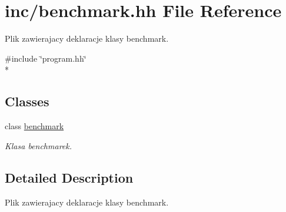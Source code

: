 \hypertarget{benchmark_8hh}{\section{inc/benchmark.hh File Reference}
\label{benchmark_8hh}
}


Plik zawierajacy deklaracje klasy benchmark.  


{\ttfamily \#include \char`\"{}program.\+hh\char`\"{}}\\*
\subsection*{Classes}
\begin{DoxyCompactItemize}
\item 
class \hyperlink{classbenchmark}{benchmark}
\begin{DoxyCompactList}\small\item\em Klasa benchmarek. \end{DoxyCompactList}\end{DoxyCompactItemize}


\subsection{Detailed Description}
Plik zawierajacy deklaracje klasy benchmark. 

